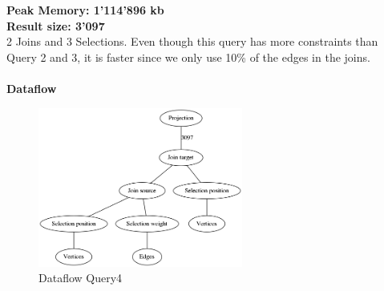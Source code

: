 \documentclass[11pt,singlecolumn]{scrartcl}
\begin{document}
\textbf{Peak Memory: 1'114'896 kb}\\
\textbf{Result size: 3'097}\\
2 Joins and 3 Selections. Even though this query has more constraints than Query 2 and 3, it is faster since we only use 10\% of the edges in the joins. \\\\
\textbf{Dataflow}
\begin{figure}[H]
\includegraphics[width=0.6\textwidth]{graph4}
\caption{Dataflow Query4}
\end{figure}
\clearpage
\end{document}
